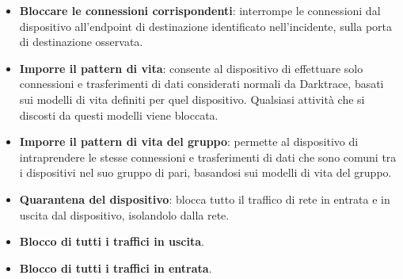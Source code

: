 \begin{itemize}
	\item \textbf{Bloccare le connessioni corrispondenti}: interrompe le connessioni dal dispositivo all'endpoint di destinazione identificato nell'incidente, sulla porta di destinazione osservata.
	\item \textbf{Imporre il pattern di vita}: consente al dispositivo di effettuare solo connessioni e trasferimenti di dati considerati normali da Darktrace, basati sui modelli di vita definiti per quel dispositivo. Qualsiasi attività che si discosti da questi modelli viene bloccata.
	\item \textbf{Imporre il pattern di vita del gruppo}: permette al dispositivo di intraprendere le stesse connessioni e trasferimenti di dati che sono comuni tra i dispositivi nel suo gruppo di pari, basandosi sui modelli di vita del gruppo.
	\item \textbf{Quarantena del dispositivo}: blocca tutto il traffico di rete in entrata e in uscita dal dispositivo, isolandolo dalla rete.
	\item \textbf{Blocco di tutti i traffici in uscita}.
	\item \textbf{Blocco di tutti i traffici in entrata}\cite{respond}.
\end{itemize}